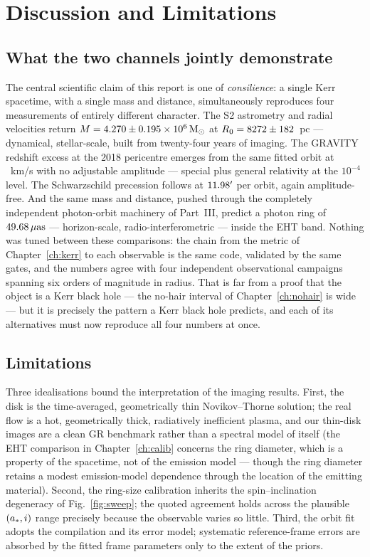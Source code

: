 \chapter{Discussion and Limitations}
\label{ch:discussion}

\section{What the two channels jointly demonstrate}
\label{sec:consilience}

The central scientific claim of this report is one of
\emph{consilience}: a single Kerr spacetime, with a single mass and
distance, simultaneously reproduces four measurements of entirely
different character. The S2 astrometry and radial velocities return
$M = 4.270\pm0.195\times10^6\,\mathrm{M}_\odot$ at
$R_0 = 8272\pm182$~pc — dynamical, stellar-scale, built
from twenty-four years of imaging. The GRAVITY redshift excess at the
2018 pericentre emerges from the same fitted orbit at
\GrExcessPeak~km/s with no adjustable amplitude — special plus general
relativity at the $10^{-4}$ level. The Schwarzschild precession
follows at $11.98'$ per orbit, again amplitude-free. And the same
mass and distance, pushed through the completely independent
photon-orbit machinery of Part~III, predict a photon ring of
$49.68\,\mu\mathrm{as}$ — horizon-scale, radio-interferometric — inside
the EHT band. Nothing was tuned between these comparisons: the chain
from the metric of Chapter~\ref{ch:kerr} to each observable is the
same code, validated by the same gates, and the numbers agree with
four independent observational campaigns spanning six orders of
magnitude in radius. That is far from a proof that the object is a
Kerr black hole — the no-hair interval of Chapter~\ref{ch:nohair} is
wide — but it is precisely the pattern a Kerr black hole predicts, and
each of its alternatives must now reproduce all four numbers at once.

\section{Limitations}
\label{sec:limitations}

Three idealisations bound the interpretation of the imaging results.
First, the disk is the time-averaged, geometrically thin
Novikov--Thorne solution; the real \sgra{} flow is a hot, geometrically
thick, radiatively inefficient plasma, and our thin-disk images are a
clean GR benchmark rather than a spectral model of \sgra{} itself
(the EHT comparison in Chapter~\ref{ch:calib} concerns the ring
diameter, which is a property of the spacetime, not of the emission
model --- though the ring diameter retains a modest emission-model
dependence through the location of the emitting material). Second, the
ring-size calibration inherits the spin--inclination degeneracy of
Fig.~\ref{fig:sweep}; the quoted agreement holds across the plausible
$(a_*, i)$ range precisely because the observable varies so little.
Third, the orbit fit adopts the \citet{Gillessen2017} compilation and its
error model; systematic reference-frame errors are absorbed by the fitted
frame parameters only to the extent of the \citet{Plewa2015} priors.

